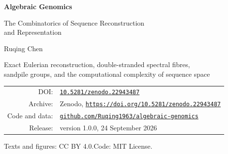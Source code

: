 \documentclass[11pt]{book}
\newcommand{\AGdoi}{10.5281/zenodo.22943487}
\newcommand{\AGrelease}{24 September 2026}
\newcommand{\AGversion}{1.0.0}
\begin{document}
\begin{titlepage}
\centering
\vspace*{3cm}
{\Huge\bfseries Algebraic Genomics\par}
\vspace{0.6cm}
{\Large The Combinatorics of Sequence Reconstruction\\[2pt] and Representation\par}
\vspace{2cm}
{\Large Ruqing Chen\par}
\vfill
{\large Exact Eulerian reconstruction, double-stranded spectral fibres,\\
sandpile groups, and the computational complexity of sequence space\par}
\vspace{1.5cm}
\begin{tabular}{rl}
DOI: & \href{https://doi.org/\AGdoi}{\texttt{\AGdoi}}\\[2pt]
Archive: & Zenodo, \href{https://doi.org/\AGdoi}{\texttt{https://doi.org/\AGdoi}}\\[2pt]
Code and data: & \href{https://github.com/Ruqing1963/algebraic-genomics}{\texttt{github.com/Ruqing1963/algebraic-genomics}}\\[2pt]
Release: & version \AGversion, \AGrelease
\end{tabular}
\vspace{1.2cm}

{\small Texts and figures: CC BY 4.0.\quad Code: MIT License.\par}
\end{titlepage}
\end{document}
